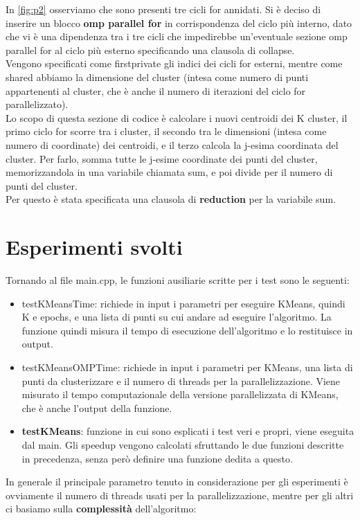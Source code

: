 \documentclass[10pt,twocolumn,letterpaper]{article}
\newcommand{\bit} {\begin{itemize} }
\newcommand{\eit} {\end{itemize} }
\begin{document}
In \cref{fig:p2} osserviamo che sono presenti tre cicli for annidati. Si è deciso di inserire un blocco \textbf{omp parallel for} in corrispondenza del ciclo più interno, dato che vi è una dipendenza tra i tre cicli che impedirebbe un'eventuale sezione omp parallel for al ciclo più esterno specificando una clausola di collapse.\\
Vengono specificati come firstprivate gli indici dei cicli for esterni, mentre come shared abbiamo la dimensione del cluster (intesa come numero di punti appartenenti al cluster, che è anche il numero di iterazioni del ciclo for parallelizzato).\\
Lo scopo di questa sezione di codice è calcolare i nuovi centroidi dei K cluster, il primo ciclo for scorre tra i cluster, il secondo tra le dimensioni (intesa come numero di coordinate) dei centroidi, e il terzo calcola la j-esima coordinata del cluster. Per farlo, somma tutte le j-esime coordinate dei punti del cluster, memorizzandola in una variabile chiamata sum, e poi divide per il numero di punti del cluster.\\
Per questo è stata specificata una clausola di \textbf{reduction} per la variabile sum.


\section{Esperimenti svolti}
\label{sec:exp}
Tornando al file main.cpp, le funzioni ausiliarie scritte per i test sono le seguenti:

\bit
    \item{testKMeansTime: richiede in input i parametri per eseguire KMeans, quindi K e epochs, e una lista di punti su cui andare ad eseguire l'algoritmo. La funzione quindi misura il tempo di esecuzione dell'algoritmo e lo restituisce in output.}
    \item{testKMeansOMPTime: richiede in input i parametri per KMeans, una lista di punti da clusterizzare e il numero di threads per la parallelizzazione. Viene misurato il tempo computazionale della versione parallelizzata di KMeans, che è anche l'output della funzione.}
    \item{\textbf{testKMeans}: funzione in cui sono esplicati i test veri e propri, viene eseguita dal main. Gli speedup vengono calcolati sfruttando le due funzioni descritte in precedenza, senza però definire una funzione dedita a questo.}
\eit

In generale il principale parametro tenuto in considerazione per gli esperimenti è ovviamente il numero di threads usati per la parallelizzazione, mentre per gli altri ci basiamo sulla \textbf{complessità} dell'algoritmo:
\end{document}

